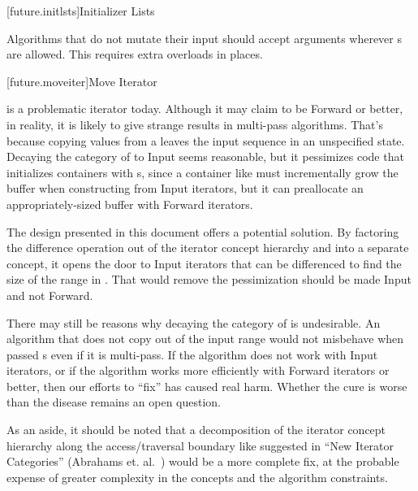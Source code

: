 {\color{newclr}
[future.initlsts]{Initializer Lists}

\pnum
Algorithms that do not mutate their input should accept  arguments wherever
s are allowed. This requires extra overloads in places.

[future.moveiter]{Move Iterator}

\pnum
{} is a problematic iterator today. Although it may claim to be Forward or better,
in reality, it is likely to give strange results in multi-pass algorithms. That's because copying
values from a  leaves the input sequence in an unspecified state. Decaying the
category of  to Input seems reasonable, but it pessimizes code that
initializes containers with s, since a container like  must
incrementally grow the buffer when constructing from Input iterators, but it can preallocate an
appropriately-sized buffer with Forward iterators.

\pnum
The design presented in this document offers a potential solution. By factoring the difference
operation out of the iterator concept hierarchy and into a separate 
concept, it opens the door to Input iterators that can be differenced to find the size of the range
in . That would remove the pessimization should  be made Input and
not Forward.

\pnum
There may still be reasons why decaying the category of  is undesirable.
An algorithm that does not copy out of the input range would not misbehave when passed
s even if it is multi-pass. If the algorithm does not work with Input iterators,
or if the algorithm works more efficiently with Forward iterators or better, then our efforts
to ``fix''  has caused real harm. Whether the cure is worse than the disease
remains an open question.

\pnum
As an aside, it should be noted that a decomposition of the iterator concept hierarchy along
the access/traversal boundary like suggested in ``New Iterator Categories''
(Abrahams et. al.~\cite{TODO}) would be a more complete fix, at the probable expense of greater
complexity in the concepts and the algorithm constraints.
}
